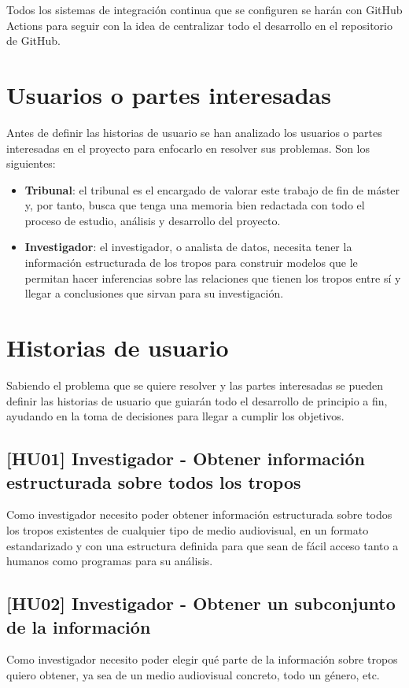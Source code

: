 Todos los sistemas de integración continua que se configuren se harán con GitHub Actions para seguir con la idea de centralizar todo el desarrollo en el repositorio de GitHub.

\section{Usuarios o partes interesadas}
Antes de definir las historias de usuario se han analizado los usuarios o partes interesadas en el proyecto para enfocarlo en resolver sus problemas. Son los siguientes:
\begin{itemize}
    \item \textbf{Tribunal}: el tribunal es el encargado de valorar este trabajo de fin de máster y, por tanto, busca que tenga una memoria bien redactada con todo el proceso de estudio, análisis y desarrollo del proyecto.
    \item \textbf{Investigador}: el investigador, o analista de datos, necesita tener la información estructurada de los tropos para construir modelos que le permitan hacer inferencias sobre las relaciones que tienen los tropos entre sí y llegar a conclusiones que sirvan para su investigación.
\end{itemize}

\section{Historias de usuario}
Sabiendo el problema que se quiere resolver y las partes interesadas se pueden definir las historias de usuario que guiarán todo el desarrollo de principio a fin, ayudando en la toma de decisiones para llegar a cumplir los objetivos.

\subsection{[HU01] Investigador - Obtener información estructurada sobre todos los tropos}
Como investigador necesito poder obtener información estructurada sobre todos los tropos existentes de cualquier tipo de medio audiovisual, en un formato estandarizado y con una estructura definida para que sean de fácil acceso tanto a humanos como programas para su análisis.

\subsection{[HU02] Investigador - Obtener un subconjunto de la información}
Como investigador necesito poder elegir qué parte de la información sobre tropos quiero obtener, ya sea de un medio audiovisual concreto, todo un género, etc.

